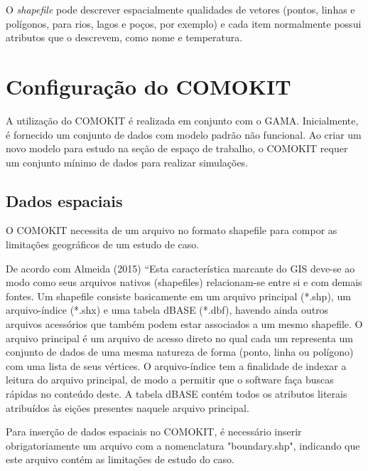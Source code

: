 
O \textit{shapefile} pode descrever espacialmente qualidades de vetores (pontos, linhas e polígonos, para rios, lagos e poços, por exemplo) e cada item normalmente possui atributos que o descrevem, como nome e temperatura. \cite{41Format2:online}





\section{Configuração do COMOKIT}

A utilização do COMOKIT é realizada em conjunto com o GAMA. Inicialmente, é fornecido um conjunto de dados com modelo padrão não funcional. 
Ao criar um novo modelo para estudo na seção de espaço de trabalho, o COMOKIT requer um conjunto mínimo de dados \cite{ComokitDoc} para realizar simulações.

\subsection{Dados espaciais}

O COMOKIT necessita de um arquivo no formato shapefile para compor as limitações geográficos de um estudo de caso. 

De acordo com Almeida (2015) “Esta característica marcante do GIS deve-se ao modo como seus arquivos nativos (shapefiles) relacionam-se entre si e com demais fontes. Um shapefile consiste basicamente em um arquivo principal (*.shp), um arquivo-índice (*.shx) e uma tabela dBASE (*.dbf), havendo ainda outros arquivos acessórios que também podem estar associados a um mesmo shapefile. O arquivo principal é um arquivo de acesso direto no qual cada um representa um conjunto de dados de uma mesma natureza de forma (ponto, linha ou polígono) com uma lista de seus vértices. O arquivo-índice tem a finalidade de indexar a leitura do arquivo principal, de modo a permitir que o software faça buscas rápidas no conteúdo deste. A tabela dBASE contém todos os atributos literais atribuídos às eições presentes naquele arquivo principal. \cite{almeida2015integraccao}

Para inserção de dados espaciais no COMOKIT, é necessário inserir obrigatoriamente um arquivo com a nomenclatura "boundary.shp", indicando que este arquivo contém as limitações de estudo do caso.

